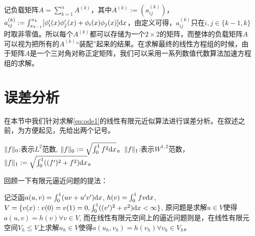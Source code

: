 记负载矩阵$A=\sum_{k=1}^{n}A^{(k)}$，其中$A^{(k)}:=(a_{ij}^{(k)})$，$a_{ij}^{(k)}:=\int_{x_{k-1}}^{x_{k}}[\phi_{i}'(x)\phi_{j}'(x)+\phi_{i}(x)\phi_{j}(x)]\mathrm{d} x$，由定义可得，$a_{ij}^{(k)}$只在$i,j\in\{k-1,k\}$时取非零值。所以每个$A^{(k)}$都可以存储为一个$2\times 2$的矩阵，而整体的负载矩阵$A$可以视为把所有的$A^{(k)}$“装配”起来的结果。在求解最终的线性方程组的时候，由于矩阵$A$是一个三对角对称正定矩阵，我们可以采用一系列数值代数算法加速方程组的求解。
\section{误差分析}
在本节中我们针对求解\eqref{eq:ode1}的线性有限元近似算法进行误差分析。在叙述之前，为方便起见，先给出两个记号。

\begin{remark}
  $\|f\|_{0}$:表示$L^{2}$范数, $\|f\|_{0}:=\sqrt{\int_{0}^{1}f^{2}\mathrm{d} x}$。$\|f\|_{1}$:表示$W^{1,2}$范数，$\|f\|_{1}:=\sqrt{\int_{0}^{1}((f')^{2}+f^{2})\mathrm{d} x}$。
\end{remark}

回顾一下有限元逼近问题的提法：
\begin{example}
  \label{prob:FE problem}
记泛函$a(u,v)=\int_{0}^{1}(uv+u'v')\mathrm{d} x$, $h(v)=\int_{0}^{1}fv\mathrm{d} x$, $V=\{v(x):v(0)=v(1)=0,\int_{0}^{1}((v')^{2}+v^2)\mathrm{d} x<\infty\}$, 原问题是求解$u\in V$使得$a(u,v)=h(v)\forall v\in V$, 而在线性有限元空间上的逼近问题则是，在线性有限元空间$V_{h}\le V$上求解$u_{h}\in V$使得$a(u_{h},v_{h})=h(v_{h})\forall v_{h}\in V_{h}$。
\end{example}

